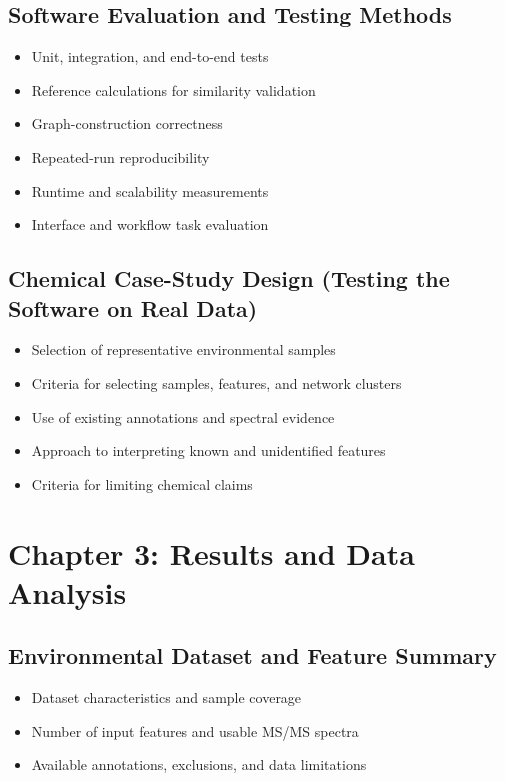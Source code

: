 \documentclass[11pt]{article}
\begin{document}
\begin{doublespace}
    \subsection{Software Evaluation and Testing Methods}
        \begin{itemize}
            \item Unit, integration, and end-to-end tests
            \item Reference calculations for similarity validation
            \item Graph-construction correctness
            \item Repeated-run reproducibility
            \item Runtime and scalability measurements
            \item Interface and workflow task evaluation
        \end{itemize}

    \subsection{Chemical Case-Study Design (Testing the Software on Real Data)}
        \begin{itemize}
            \item Selection of representative environmental samples
            \item Criteria for selecting samples, features, and network clusters
            \item Use of existing annotations and spectral evidence
            \item Approach to interpreting known and unidentified features
            \item Criteria for limiting chemical claims
        \end{itemize}

\section{Chapter 3: Results and Data Analysis}
    \subsection{Environmental Dataset and Feature Summary}
        \begin{itemize}
            \item Dataset characteristics and sample coverage
            \item Number of input features and usable MS/MS spectra
            \item Available annotations, exclusions, and data limitations
        \end{itemize}
    

\end{doublespace}
\end{document}

